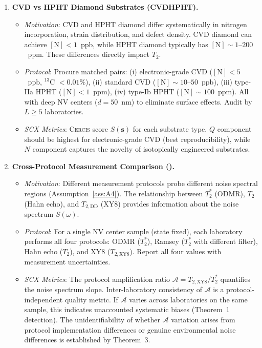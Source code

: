\documentclass[11pt,a4paper]{article}
\theoremstyle{definition}
\newcommand{\Cercis}{\textsc{Cercis}}
\newcommand{\Ttwo}{T_2}
\newcommand{\TtwoStar}{T_2^*}
\newcommand{\NV}{NV}
\begin{document}
\begin{enumerate}[label=\textbf{B\arabic*:}, leftmargin=*]
    \item \textbf{CVD vs HPHT Diamond Substrates (CVDHPHT).}
    \begin{itemize}[nosep]
        \item \textit{Motivation}: CVD and HPHT diamond differ systematically
        in nitrogen incorporation, strain distribution, and defect density.
        CVD diamond can achieve $[\text{N}] < 1$~ppb, while HPHT diamond
        typically has $[\text{N}] \sim 1$--$200$~ppm. These differences
        directly impact $\Ttwo$.
        \item \textit{Protocol}: Procure matched pairs: (i) electronic-grade
        CVD ($[\text{N}] < 5$~ppb, ${}^{13}$C $< 0.01\%$), (ii) standard
        CVD ($[\text{N}] \sim 10$--$50$~ppb), (iii) type-IIa HPHT
        ($[\text{N}] < 1$~ppm), (iv) type-Ib HPHT ($[\text{N}] \sim 100$~ppm).
        All with deep \NV{} centers ($d = 50$~nm) to eliminate surface effects.
        Audit by $L \geq 5$ laboratories.
        \item \textit{SCX Metrics}: \Cercis{} score $S(\mathbf{s})$ for each
        substrate type. $Q$ component should be highest for electronic-grade
        CVD (best reproducibility), while $N$ component captures the novelty
        of isotopically engineered substrates.
    \end{itemize}

    \item \textbf{Cross-Protocol Measurement Comparison ().}
    \begin{itemize}[nosep]
        \item \textit{Motivation}: Different measurement protocols probe
        different noise spectral regions (Assumption~\ref{ass:A4}). The
        relationship between $\TtwoStar$ (ODMR), $\Ttwo$ (Hahn echo), and
        $T_{2,\text{DD}}$ (XY8) provides information about the noise spectrum
        $S(\omega)$.
        \item \textit{Protocol}: For a single \NV{} center sample (state fixed),
        each laboratory performs all four protocols: ODMR ($\TtwoStar$),
        Ramsey ($\TtwoStar$ with different filter), Hahn echo ($\Ttwo$),
        and XY8 ($T_{2,\text{XY8}}$). Report all four values with measurement
        uncertainties.
        \item \textit{SCX Metrics}: The protocol amplification ratio
        $\mathcal{A} = T_{2,\text{XY8}} / \TtwoStar$ quantifies the noise
        spectrum slope. Inter-laboratory consistency of $\mathcal{A}$ is a
        protocol-independent quality metric. If $\mathcal{A}$ varies across
        laboratories on the same sample, this indicates unaccounted systematic
        biases (Theorem~1 detection). The unidentifiability of whether
        $\mathcal{A}$ variation arises from protocol implementation differences
        or genuine environmental noise differences is established by Theorem~3.
    \end{itemize}

\end{enumerate}
\end{document}
